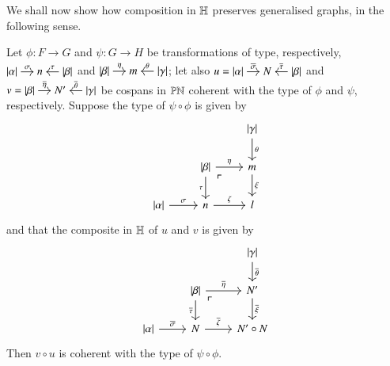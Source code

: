 We shall now show how composition in $\mathbb H$ preserves generalised graphs, in the following sense.

\begin{proposition}\label{proposition: composition in G preservers generalised graphs}
    Let $\phi \colon F \to G$ and $\psi \colon G \to H$ be transformations of type, respectively, 
    $
    \begin{tikzcd}[cramped,sep=small]
    \length\alpha \ar[r,"\sigma"] & n & \length\beta \ar[l,"\tau"']
    \end{tikzcd}
    $
    and
    $
    \begin{tikzcd}[cramped,sep=small]
    \length\beta \ar[r,"\eta"] & m & \length\gamma \ar[l,"\theta"']
    \end{tikzcd}
    $; let also 
    $u=
    \begin{tikzcd}[cramped,sep=small]
    \length\alpha \ar[r,"\overline\sigma"] & N & \length\beta \ar[l,"\overline\tau"']
    \end{tikzcd}
    $
    and
    $v=
    \begin{tikzcd}[cramped,sep=small]
    \length\beta \ar[r,"\overline\eta"] & N' & \length\gamma \ar[l,"\overline\theta"']
    \end{tikzcd}
    $
    be cospans in $\mathbb{PN}$ coherent with the type of $\phi$ and $\psi$, respectively. Suppose the type of $\psi \circ \phi$ is given by
    \[
    \begin{tikzcd}
    & & \length\gamma \ar[d,"\theta"] \\
    & \length\beta \ar[d,"\tau"'] \ar[r,"\eta"] \ar[dr, phantom, "\ulcorner" very near start] & m \ar[d,"\xi"] \\
    \length\alpha \ar[r,"\sigma"] & n \ar[r,"\zeta"] & l
    \end{tikzcd}
    \]
    and that the composite in $\mathbb H$ of $u$ and $v$ is given by
    \begin{equation}\label{composite generalised graphs}
    \begin{tikzcd}
    & & \length\gamma \ar[d,"\overline\theta"] \\
    & \length\beta \ar[d,"\overline\tau"'] \ar[r,"\overline\eta"] \ar[dr, phantom, "\ulcorner" very near start] & N' \ar[d,"\overline\xi"] \\
    \length\alpha \ar[r,"\overline\sigma"] & N \ar[r,"\overline\zeta"] & N' \circ N
    \end{tikzcd}
    \end{equation}
    Then $v\circ u$ is coherent with the type of $\psi \circ \phi$.
\end{proposition}
